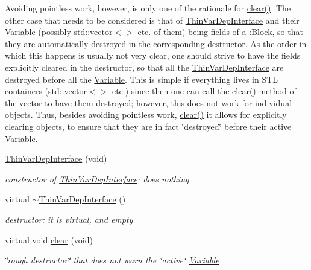 \begin{Indent}
{Avoiding pointless work, however, is only one of the rationale for \mbox{\hyperlink{group___thin_var_dep_interface___c_l_a_s_s_e_s_gae16067de85b435fac4ce8558b193a99a}{clear()}}. The other case that needs to be considered is that of \mbox{\hyperlink{class_s_m_spp__di__unipi__it_1_1_thin_var_dep_interface}{Thin\+Var\+Dep\+Interface}} and their \mbox{\hyperlink{class_s_m_spp__di__unipi__it_1_1_variable}{Variable}} (possibly std\+::vector$<$$>$ etc. of them) being fields of a \+:\mbox{\hyperlink{class_s_m_spp__di__unipi__it_1_1_block}{Block}}, so that they are automatically destroyed in the corresponding destructor. As the order in which this happens is usually not very clear, one should strive to have the fields explicitly cleared in the destructor, so that all the \mbox{\hyperlink{class_s_m_spp__di__unipi__it_1_1_thin_var_dep_interface}{Thin\+Var\+Dep\+Interface}} are destroyed before all the \mbox{\hyperlink{class_s_m_spp__di__unipi__it_1_1_variable}{Variable}}. This is simple if everything lives in S\+TL containers (std\+::vector$<$$>$ etc.) since then one can call the \mbox{\hyperlink{group___thin_var_dep_interface___c_l_a_s_s_e_s_gae16067de85b435fac4ce8558b193a99a}{clear()}} method of the vector to have them destroyed; however, this does not work for individual objects. Thus, besides avoiding pointless work, \mbox{\hyperlink{group___thin_var_dep_interface___c_l_a_s_s_e_s_gae16067de85b435fac4ce8558b193a99a}{clear()}} it allows for explicitly clearing objects, to ensure that they are in fact \char`\"{}destroyed\char`\"{} before their active \mbox{\hyperlink{class_s_m_spp__di__unipi__it_1_1_variable}{Variable}}. }\begin{DoxyCompactItemize}
\item 
\mbox{\hyperlink{group___thin_var_dep_interface___c_l_a_s_s_e_s_gae23264aae375852a624548a912161e7f}{Thin\+Var\+Dep\+Interface}} (void)
\begin{DoxyCompactList}\small\item\em constructor of \mbox{\hyperlink{class_s_m_spp__di__unipi__it_1_1_thin_var_dep_interface}{Thin\+Var\+Dep\+Interface}}; does nothing \end{DoxyCompactList}\item 
virtual \mbox{\hyperlink{group___thin_var_dep_interface___c_l_a_s_s_e_s_ga627c883f11bd4f9b137b397be90d3996}{$\sim$\+Thin\+Var\+Dep\+Interface}} ()
\begin{DoxyCompactList}\small\item\em destructor\+: it is virtual, and empty \end{DoxyCompactList}\item 
virtual void \mbox{\hyperlink{group___thin_var_dep_interface___c_l_a_s_s_e_s_gae16067de85b435fac4ce8558b193a99a}{clear}} (void)
\begin{DoxyCompactList}\small\item\em \char`\"{}rough destructor\char`\"{} that does not warn the \char`\"{}active\char`\"{} \mbox{\hyperlink{class_s_m_spp__di__unipi__it_1_1_variable}{Variable}} \end{DoxyCompactList}\end{DoxyCompactItemize}
\end{Indent}
